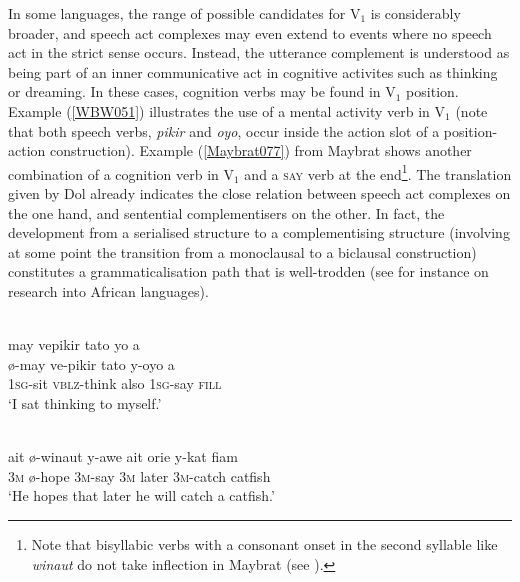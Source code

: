 In some languages, the range of possible candidates for V$_{1}$ is considerably broader, and speech act complexes may even extend to events where no speech act in the strict sense occurs. Instead, the utterance complement is understood as being part of an inner communicative act in cognitive activites such as thinking or dreaming. In these cases, cognition verbs may be found in V$_{1}$ position. Example (\ref{WBW051}) illustrates the use of a mental activity verb in V$_{1}$ (note that both speech verbs, \textit{pikir} and \textit{oyo}, occur inside the action slot of a position-action construction). Example (\ref{Maybrat077}) from Maybrat shows another combination of a cognition verb in V$_{1}$ and a \textsc{say} verb at the end\footnote{Note that bisyllabic verbs with a consonant onset in the second syllable like \textit{winaut} do not take inflection in Maybrat (see \citealt[52]{dol2007grammar}).}. The translation given by Dol already indicates the close relation between speech act complexes on the one hand, and sentential complementisers on the other. In fact, the development from a serialised structure to a complementising structure (involving at some point the transition from a monoclausal to a biclausal construction) constitutes a grammaticalisation path that is well-trodden (see for instance \citealt{lord1993historical} on research into African languages).

\ea \label{WBW051}
\\
\glll may vepikir tato yo a \\
ø-may ve-pikir tato y-oyo a \\
\textsc{1}\textsc{sg}-sit \textsc{vblz}-think also \textsc{1}\textsc{sg}-say \textsc{fill} \\
\glft `I sat thinking to myself.'\\ 
\z

\ea \label{Maybrat077}
\\
\gll ait ø-winaut y-awe ait orie y-kat fiam \\
\textsc{3}\textsc{m} ø-hope \textsc{3}\textsc{m}-say \textsc{3}\textsc{m} later \textsc{3}\textsc{m}-catch catfish \\
\glft `He hopes that later he will catch a catfish.'\\ 
\z

